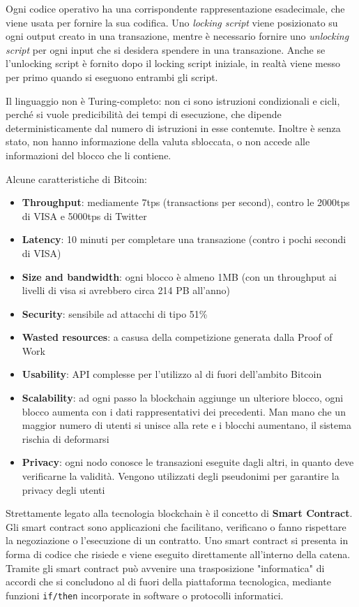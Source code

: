 Ogni codice operativo ha una corrispondente rappresentazione esadecimale, che viene usata per fornire la sua codifica. Uno \textit{locking script} viene posizionato su ogni output creato in una transazione, mentre è necessario fornire uno \textit{unlocking script} per ogni input che si desidera spendere in una transazione. Anche se l'unlocking script è fornito dopo il locking script iniziale, in realtà viene messo per primo quando si eseguono entrambi gli script.

Il linguaggio non è Turing-completo: non ci sono istruzioni condizionali e cicli, perché si vuole predicibilità dei tempi di esecuzione, che dipende deterministicamente dal numero di istruzioni in esse contenute. Inoltre è senza stato, non hanno informazione della valuta sbloccata, o non accede alle informazioni del blocco che li contiene.



Alcune caratteristiche di Bitcoin:
\begin{itemize}
    \item \textbf{Throughput}: mediamente 7tps (transactions per second), contro le 2000tps di VISA e 5000tps di Twitter
    \item \textbf{Latency}: 10 minuti per completare una transazione (contro i pochi secondi di VISA)
    \item \textbf{Size and bandwidth}: ogni blocco è almeno 1MB (con un throughput ai livelli di visa si avrebbero circa 214 PB all'anno)
    \item \textbf{Security}: sensibile ad attacchi di tipo 51\%
    \item \textbf{Wasted resources}: a casusa della competizione generata dalla Proof of Work
    \item \textbf{Usability}: API complesse per l'utilizzo al di fuori dell'ambito Bitcoin
    \item \textbf{Scalability}: ad ogni passo la blockchain aggiunge un ulteriore blocco, ogni blocco aumenta con i dati rappresentativi dei precedenti. Man mano che un maggior numero di utenti si unisce alla rete e i blocchi aumentano, il sistema rischia di deformarsi
    \item \textbf{Privacy}: ogni nodo conosce le transazioni eseguite dagli altri, in quanto deve verificarne la validità. Vengono utilizzati degli pseudonimi per garantire la privacy degli utenti
\end{itemize}
Strettamente legato alla tecnologia blockchain è il concetto di \textbf{Smart Contract}. Gli smart contract sono applicazioni che facilitano, verificano o fanno rispettare la negoziazione o l'esecuzione di un contratto. Uno smart contract si presenta in forma di codice che risiede e viene eseguito direttamente all'interno della catena. Tramite gli smart contract può avvenire una trasposizione "informatica" di accordi che si concludono al di fuori della piattaforma tecnologica, mediante funzioni \texttt{if/then} incorporate in software o protocolli informatici.

